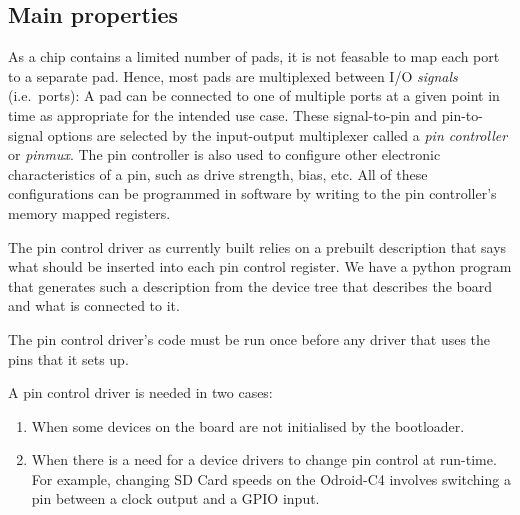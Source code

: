 \documentclass[a4paper,12pt]{report}
\newcommand{\Comment}[1]{\textbf{\textsl{#1}}}
\newcommand{\Comment}[1]{\relax}
\newcommand{\gernot}[1]{\Comment{#1 \colorbox{yellow}{[gernot]}}}
\newcommand{\code}[1]{\texttt{#1}}
\begin{document}
\subsection{Main properties}
As a chip contains a limited number of pads, it is not feasable to map each
port to a separate pad. Hence, most pads are multiplexed between I/O
\emph{signals} (i.e.\ ports):  A pad
can be connected to one of multiple ports at a given point in time as appropriate for the
intended use case. These signal-to-pin and pin-to-signal options are selected by the input-output
multiplexer called a \emph{pin controller} or \emph{pinmux}. The pin controller is also used to configure other
electronic characteristics of a pin, such as drive strength, bias, etc. All of these configurations
can be programmed in software by writing to the pin controller's memory mapped registers.

\iffalse
\gernot{The rest of this section is specific to Microkit/LionsOS and do not
  belong here (or only in a much abstracted form) with details in Appendix~A1.}

Before the pin control driver is built, a Python script will read the target board's device tree
source file, extracting all the pin control settings and encodes them as binary values in an assembly
file. Then the driver is built and linked with the pinctrl data assembly file, creating a complete
pin control driver ELF image.

The pin control driver must be exclusively assigned the highest priority to ensure that it is the first
PD initialised in the system. At \code{init()} time, the driver will read the encoded pin control data and
write it into the pin control device's registers.
\else
The pin control driver as currently built relies on a prebuilt
description that says what should be inserted into each pin control
register.  We have a python program that generates such a description
from the device tree that describes the board and what is connected to
it.

The pin control driver's code must be run once before any driver that
uses the pins that it sets up.
\fi

A pin control driver is needed in two cases:
\begin{enumerate}
  \item When some devices on the board are not initialised by the bootloader.
  \item When there is a need for a device drivers to change pin
    control at run-time. For example, changing SD Card speeds on the
    Odroid-C4 involves switching a pin between a clock output and a
    GPIO input.
\end{enumerate}
\end{document}
